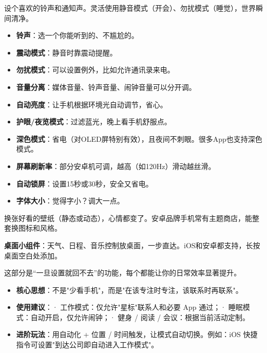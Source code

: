 


设个喜欢的铃声和通知声。灵活使用静音模式（开会）、勿扰模式（睡觉），世界瞬间清净。

\begin{itemize}
  \item \textbf{铃声}：选一个你能听到的、不尴尬的。
  \item \textbf{震动模式}：静音时靠震动提醒。
  \item \textbf{勿扰模式}：可以设置例外，比如允许通讯录来电。
  \item \textbf{音量分离}：媒体音量、铃声音量、闹钟音量可以分开调。
\end{itemize}


\begin{itemize}
  \item \textbf{自动亮度}：让手机根据环境光自动调节，省心。
  \item \textbf{护眼/夜览模式}：过滤蓝光，晚上看手机舒服点。
  \item \textbf{深色模式}：省电（对OLED屏特别有效），且夜间不刺眼。很多App也支持深色模式。
  \item \textbf{屏幕刷新率}：部分安卓机可调，越高（如120Hz）滑动越丝滑。
  \item \textbf{自动锁屏}：设置15秒或30秒，安全又省电。
  \item \textbf{字体大小}：觉得字小？调大一点。
\end{itemize}


换张好看的壁纸（静态或动态），心情都变了。安卓品牌手机常有主题商店，能整套换图标和风格。

\textbf{桌面小组件}：天气、日程、音乐控制放桌面，一步直达。iOS和安卓都支持，长按桌面空白处添加。


这部分是“一旦设置就回不去”的功能，每个都能让你的日常效率显著提升。


\begin{itemize}
  \item \textbf{核心思想}：不是"少看手机"，而是"在该专注时专注，该联系时再联系"。
  \item \textbf{使用建议}：\newline · 工作模式：仅允许"星标"联系人和必要 App 通过；\newline · 睡眠模式：自动开启，仅允许闹钟；\newline · 健身 / 阅读 / 会议：根据当前活动定制。
  \item \textbf{进阶玩法}：用自动化 + 位置 / 时间触发，让模式自动切换。例如：iOS 快捷指令可设置"到达公司即自动进入工作模式"。
\end{itemize}

